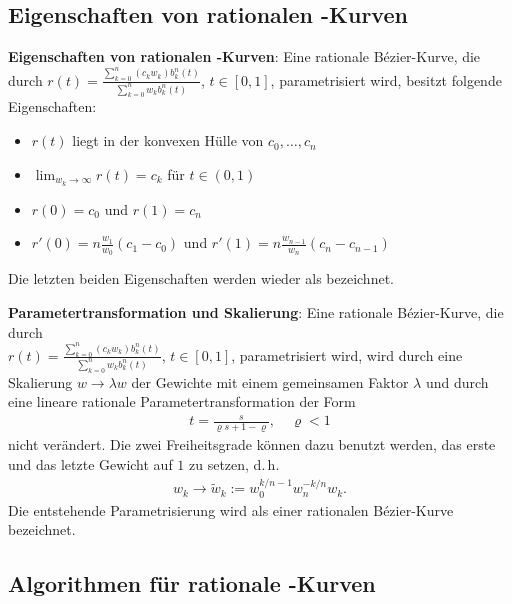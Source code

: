 \subsection{%
    Eigenschaften von rationalen -Kurven%
}

\textbf{Eigenschaften von rationalen -Kurven}:
Eine rationale Bézier-Kurve, die durch
$r(t) = \frac{\sum_{k=0}^n (c_k w_k) b_k^n(t)}{\sum_{k=0}^n w_k b_k^n(t)}$, $t \in [0, 1]$,
parametrisiert wird, besitzt folgende Eigenschaften:
\begin{itemize}
    \item
    $r(t)$ liegt in der konvexen Hülle von $c_0, \dotsc, c_n$
    
    \item
    $\lim_{w_k \to \infty} r(t) = c_k$ für $t \in (0, 1)$
    
    \item
    $r(0) = c_0$ und $r(1) = c_n$
    
    \item
    $r'(0) = n \frac{w_1}{w_0} (c_1 - c_0)$ und $r'(1) = n \frac{w_{n-1}}{w_n} (c_n - c_{n-1})$
\end{itemize}
Die letzten beiden Eigenschaften werden wieder als  bezeichnet.

\linie
\pagebreak

\textbf{Parametertransformation und Skalierung}:
Eine rationale Bézier-Kurve, die durch\\
$r(t) = \frac{\sum_{k=0}^n (c_k w_k) b_k^n(t)}{\sum_{k=0}^n w_k b_k^n(t)}$, $t \in [0, 1]$,
parametrisiert wird, wird durch eine Skalierung $w \rightarrow \lambda w$
der Gewichte mit einem gemeinsamen Faktor $\lambda$ und durch eine lineare rationale
Parametertransformation der Form
\begin{align*}
    t = \frac{s}{\varrho s + 1 - \varrho},\quad \varrho < 1
\end{align*}
nicht verändert.
Die zwei Freiheitsgrade können dazu benutzt werden, das erste und das letzte Gewicht auf $1$
zu setzen, d.\,h.
\begin{align*}
    w_k \rightarrow \widetilde{w}_k := w_0^{k/n-1} w_n^{-k/n} w_k.
\end{align*}
Die entstehende Parametrisierung wird als  einer rationalen
Bézier-Kurve bezeichnet.

\subsection{%
    Algorithmen für rationale -Kurven%
}

